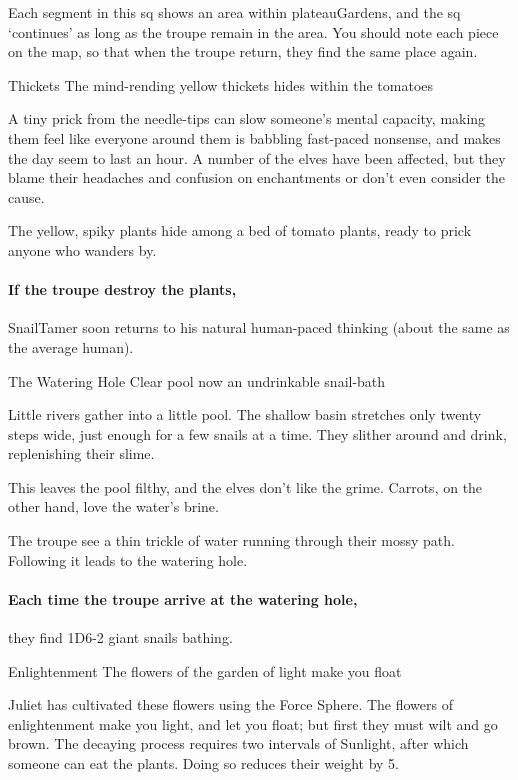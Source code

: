 
Each \gls{segment} in this \gls{sq} shows an area within \gls{plateauGardens}, and the \gls{sq} `continues' as long as the troupe remain in the \gls{area}.
You should note each piece on the map, so that when the troupe return, they find the same place again.

{ Thickets}%
{The mind-rending yellow thickets hides within the tomatoes}%

A tiny prick from the needle-tips can slow someone's mental capacity, making them feel like everyone around them is babbling fast-paced nonsense, and makes the day seem to last an hour.
A number of the elves have been affected, but they blame their headaches and confusion on enchantments or don't even consider the cause.

The yellow, spiky plants hide among a bed of tomato plants, ready to prick anyone who wanders by.

\paragraph{If the troupe destroy the plants,}
\gls{SnailTamer} soon returns to his natural human-paced thinking (about the same as the average human).

{The Watering Hole}%
{Clear pool now an undrinkable snail-bath}%

Little rivers gather into a little pool.
The shallow basin stretches only twenty steps wide, just enough for a few snails at a time.
They slither around and drink, replenishing their slime.

This leaves the pool filthy, and the elves don't like the grime.
Carrots, on the other hand, love the water's brine.

The troupe see a thin trickle of water running through their mossy path.
Following it leads to the watering hole.

\paragraph{Each time the troupe arrive at the watering hole,}
they find 1D6-2 giant snails bathing.


{Enlightenment}%
{The flowers of the garden of light make you float}%

Juliet has cultivated these flowers using the Force Sphere.
The flowers of enlightenment make you light, and let you float; but first they must wilt and go brown.
The decaying process requires two \glspl{interval} of Sunlight, after which someone can eat the plants.
Doing so reduces their \gls{weight} by 5.

